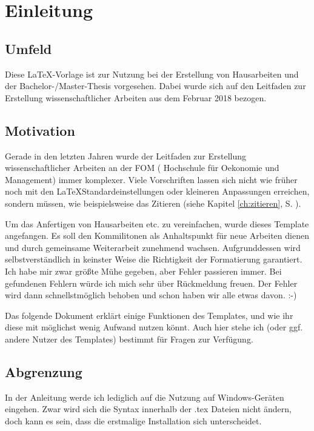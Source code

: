\chapter{Einleitung}
\label{ch:einleitung}

\section{Umfeld}
Diese \LaTeX -Vorlage ist zur Nutzung bei der Erstellung von Hausarbeiten und der Bachelor-/Master-Thesis vorgesehen. Dabei wurde sich auf den Leitfaden zur Erstellung wissenschaftlicher Arbeiten aus dem Februar 2018 bezogen.\autocite{leitfaden}

\section{Motivation}
Gerade in den letzten Jahren wurde der Leitfaden zur Erstellung wissenschaftlicher Arbeiten an der FOM ( Hochschule für Oekonomie und Management) immer komplexer. Viele Vorschriften lassen sich nicht wie früher noch mit den \LaTeX\-Standardeinstellungen oder kleineren Anpassungen erreichen, sondern müssen, wie beispielsweise das Zitieren (siehe Kapitel \ref{ch:zitieren}, S. \pageref{ch:zitieren}).

Um das Anfertigen von Hausarbeiten etc. zu vereinfachen, wurde dieses Template angefangen. Es soll den Kommilitonen als Anhaltspunkt für neue Arbeiten dienen und durch gemeinsame Weiterarbeit zunehmend wachsen. Aufgrunddessen wird selbstverständlich in keinster Weise die Richtigkeit der Formatierung garantiert. Ich habe mir zwar größte Mühe gegeben, aber Fehler passieren immer. Bei gefundenen Fehlern würde ich mich sehr über Rückmeldung freuen. Der Fehler wird dann schnellstmöglich behoben und schon haben wir alle etwas davon. :-)

Das folgende Dokument erklärt einige Funktionen des Templates, und wie ihr diese mit möglichst wenig Aufwand nutzen könnt. Auch hier stehe ich (oder ggf. andere Nutzer des Templates) bestimmt für Fragen zur Verfügung.

\section{Abgrenzung}
In der Anleitung werde ich lediglich auf die Nutzung auf Windows-Geräten eingehen. Zwar wird sich die Syntax innerhalb der .tex Dateien nicht ändern, doch kann es sein, dass die erstmalige Installation sich unterscheidet.